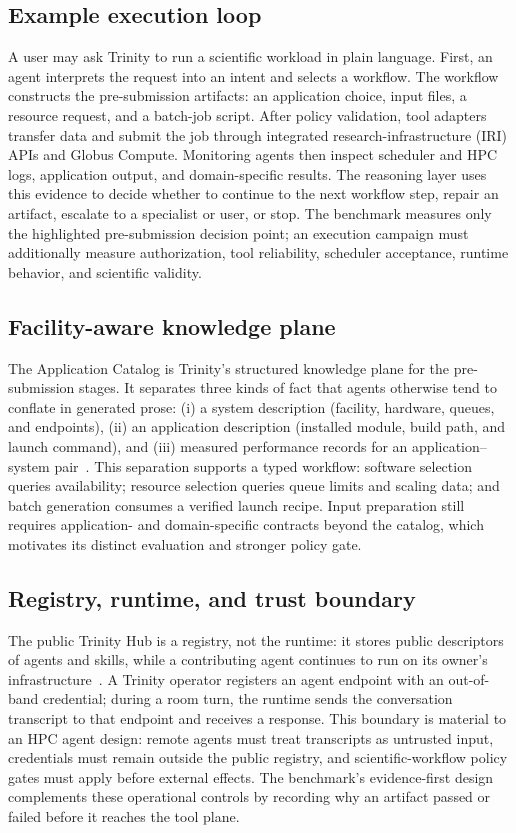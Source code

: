 \documentclass[conference]{IEEEtran}
\begin{document}
\subsection{Example execution loop}
A user may ask Trinity to run a scientific workload in plain language. First, an agent interprets the request into an intent and selects a workflow. The workflow constructs the pre-submission artifacts: an application choice, input files, a resource request, and a batch-job script. After policy validation, tool adapters transfer data and submit the job through integrated research-infrastructure (IRI) APIs and Globus Compute. Monitoring agents then inspect scheduler and HPC logs, application output, and domain-specific results. The reasoning layer uses this evidence to decide whether to continue to the next workflow step, repair an artifact, escalate to a specialist or user, or stop. The benchmark measures only the highlighted pre-submission decision point; an execution campaign must additionally measure authorization, tool reliability, scheduler acceptance, runtime behavior, and scientific validity.

\subsection{Facility-aware knowledge plane}
The Application Catalog is Trinity's structured knowledge plane for the pre-submission stages. It separates three kinds of fact that agents otherwise tend to conflate in generated prose: (i) a system description (facility, hardware, queues, and endpoints), (ii) an application description (installed module, build path, and launch command), and (iii) measured performance records for an application--system pair~\cite{applicationcatalog}. This separation supports a typed workflow: software selection queries availability; resource selection queries queue limits and scaling data; and batch generation consumes a verified launch recipe. Input preparation still requires application- and domain-specific contracts beyond the catalog, which motivates its distinct evaluation and stronger policy gate.

\subsection{Registry, runtime, and trust boundary}
The public Trinity Hub is a registry, not the runtime: it stores public descriptors of agents and skills, while a contributing agent continues to run on its owner's infrastructure~\cite{trinitydocs}. A Trinity operator registers an agent endpoint with an out-of-band credential; during a room turn, the runtime sends the conversation transcript to that endpoint and receives a response. This boundary is material to an HPC agent design: remote agents must treat transcripts as untrusted input, credentials must remain outside the public registry, and scientific-workflow policy gates must apply before external effects. The benchmark's evidence-first design complements these operational controls by recording why an artifact passed or failed before it reaches the tool plane.
\end{document}
